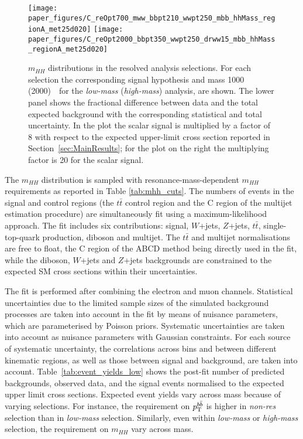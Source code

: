 \begin{figure}
\begin{center}
\texttt{[image: paper\_figures/C\_reOpt700\_mww\_bbpt210\_wwpt250\_mbb\_hhMass\_regionA\_met25d020]}
\texttt{[image: paper\_figures/C\_reOpt2000\_bbpt350\_wwpt250\_drww15\_mbb\_hhMass\_regionA\_met25d020]}
\end{center}
\caption{$m_{HH}$ distributions in the resolved analysis selections. For each selection the corresponding
 signal hypothesis and mass 1000 (2000)~\GeV\ for the  \emph{low-mass} (\emph{high-mass}) analysis, are shown.  The lower panel shows the fractional difference between data and the total expected background
 with the corresponding statistical and total uncertainty. In the plot the scalar signal is multiplied by a factor of 8 with respect to the expected upper-limit cross section reported in Section~\ref{sec:MainResults}; for the plot on the right
the multiplying factor is 20 for the scalar signal.}
\label{fig:mhh_2}
\end{figure}
 
 
The $m_{HH}$ distribution is sampled with resonance-mass-dependent
$m_{HH}$ requirements as reported in Table \ref{tab:mhh_cuts}.
The numbers of events in the signal and control regions (the $t\bar{t}$
control region and the C region of the multijet estimation procedure) are
simultaneously fit using a  maximum-likelihood approach. The fit includes six contributions: signal, $W$+jets,
$Z$+jets, $t\bar{t}$, single-top-quark production, diboson and multijet. The
$t\bar{t}$ and multijet normalisations are free to float, the C
region of the ABCD method being directly used in the fit, while the
diboson, $W$+jets and $Z$+jets backgrounds are constrained
to the expected SM cross sections within their uncertainties.
 
The fit is performed after combining the electron and muon channels. Statistical uncertainties due to the limited
sample sizes of the simulated background processes are taken into
account in the fit by means of nuisance parameters, which are
parameterised by Poisson priors. Systematic uncertainties are taken into account as
nuisance parameters with Gaussian constraints. For each
source of systematic uncertainty, the correlations across bins and
between different kinematic regions, as well as those between signal
and background, are taken into account.
Table~\ref{tab:event_yields_low} shows
the post-fit number of predicted backgrounds, observed data, and the
signal events normalised to the expected upper limit cross
sections. Expected event yields vary across mass because of varying selections. For instance, the requirement on $p_{\rm T}^{b \bar{b}}$ is higher in \emph{non-res} selection than in \emph{low-mass} selection. Similarly, even within \emph{low-mass} or \emph{high-mass} selection, the requirement on $m_{HH}$ vary across mass.  
 
